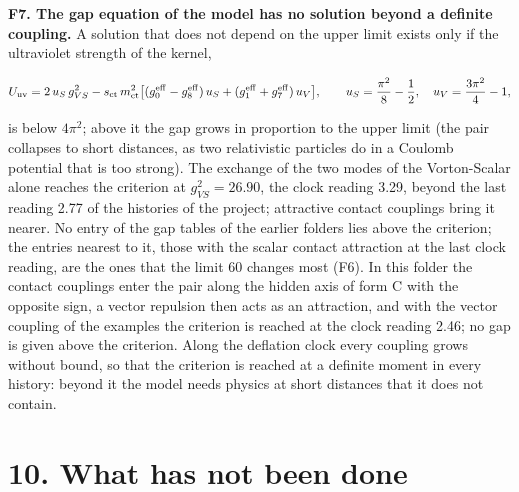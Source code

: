 \documentclass[
  10pt,
]{article}
\begin{document}
\textbf{F7. The gap equation of the model has no solution beyond a
definite coupling.} A solution that does not depend on the upper limit
exists only if the ultraviolet strength of the kernel,

\[U_{\rm uv}=2\,u_S\,g_{VS}^2-s_{\rm ct}\,m_{\rm ct}^2\big[(g_0^{\rm eff}-g_8^{\rm eff})\,u_S+(g_1^{\rm eff}+g_7^{\rm eff})\,u_V\big],
\qquad u_S=\frac{\pi^2}{8}-\frac12,\quad u_V=\frac{3\pi^2}{4}-1,\]

is below \(4\pi^2\); above it the gap grows in proportion to the upper
limit (the pair collapses to short distances, as two relativistic
particles do in a Coulomb potential that is too strong). The exchange of
the two modes of the Vorton-Scalar alone reaches the criterion at
\(g_{VS}^2=26.90\), the clock reading 3.29, beyond the last reading 2.77
of the histories of the project; attractive contact couplings bring it
nearer. No entry of the gap tables of the earlier folders lies above the
criterion; the entries nearest to it, those with the scalar contact
attraction at the last clock reading, are the ones that the limit 60
changes most (F6). In this folder the contact couplings enter the pair
along the hidden axis of form C with the opposite sign, a vector
repulsion then acts as an attraction, and with the vector coupling of
the examples the criterion is reached at the clock reading 2.46; no gap
is given above the criterion. Along the deflation clock every coupling
grows without bound, so that the criterion is reached at a definite
moment in every history: beyond it the model needs physics at short
distances that it does not contain.

\hypertarget{what-has-not-been-done}{%
\section{10. What has not been done}\label{what-has-not-been-done}}
\end{document}
